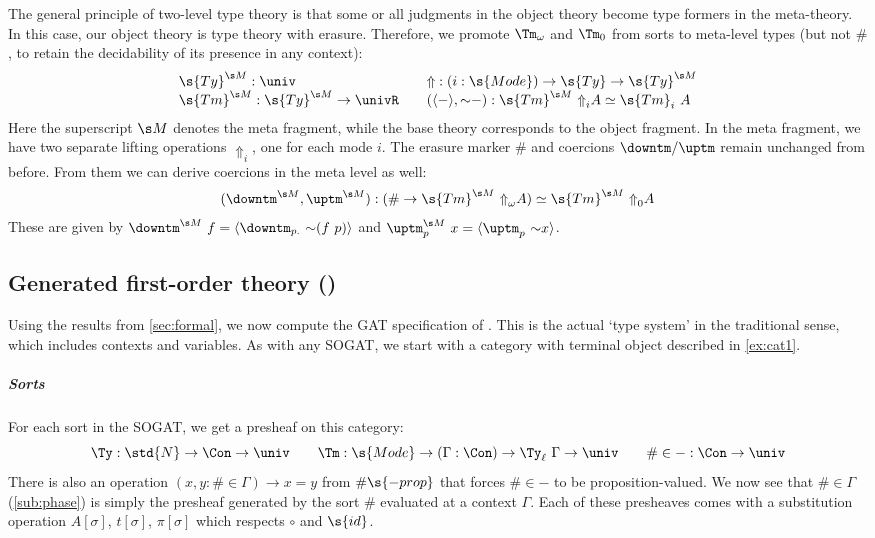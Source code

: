 \documentclass[a4paper,UKenglish,cleveref,autoref,thm-restate]{lipics-v2021}
\begin{document}
The general principle of two-level type theory is that some or all judgments in
the object theory become type formers in the meta-theory. In this case, our
object theory is type theory with erasure. Therefore, we promote $\Tm_\omega$
and $\Tm_0$ from sorts to meta-level types (but not $\#$, to retain the
decidability of its presence in any context):
\[\begin{array}{l@{\qquad}l}
\s{Ty}^{\s M} : \univ & {\Uparrow} : (i : \s{Mode}) \to \s{Ty} \to \s{Ty}^{\s M} \\
\s{Tm}^{\s M} : \s{Ty}^{\s M} \to \univR & (\langle-\rangle, {\sim}-) :
\s{Tm}^{\s M}\ {\Uparrow}_i A \simeq \s{Tm}_i\ A \end{array}\]
Here the
superscript $\s M$ denotes the meta fragment, while the base theory corresponds
to the object fragment. In the meta fragment, we have two separate lifting
operations $\Uparrow_i$, one for each mode $i$. The erasure marker $\#$ and
coercions $\downtm/\uptm$ remain unchanged from before. From them we can derive
coercions in the meta level as well:
\[\begin{array}{l}
  ({\downtm}^{\s M}, {\uptm}^{\s M}) : (\# \to \s{Tm}^{\s M}\
  {\Uparrow}_\omega A) \simeq \s{Tm}^{\s M}\ {\Uparrow}_0 A
\end{array}\]
These are given by $\downtm^{\s M}\ f = \langle {\downtm}_{p.}\ {\sim}(f\ p)
\rangle$ and $\uptm^{\s M}_p\ x = \langle \uptm_p\ {\sim} x \rangle$.


\subsection{Generated first-order theory ()}\label{sub:first-order}

Using the results from \cref{sec:formal}, we now compute the GAT specification
of \ZTT. This is the actual `type system' in the traditional sense, which
includes contexts and variables. As with any SOGAT, we start with a category
with terminal object described in \cref{ex:cat1}.

\subparagraph{Sorts}

For each sort in the SOGAT, we get a presheaf on this category:
\[
\Ty : \std{N} \to \Con \to \univ \qquad \Tm : \s{Mode} \to (\Gamma : \Con) \to
\Ty_\ell\ \Gamma \to \univ \qquad {\#\in-} : \Con \to \univ
\]
There is also an operation $(x, y : \# \in \Gamma) \to x = y$ from $\#\s{-prop}$
that forces $\# \in -$ to be proposition-valued. We now see that $\#\in\Gamma$
(\cref{sub:phase}) is simply the presheaf generated by the sort $\#$ evaluated
at a context $\Gamma$. Each of these presheaves comes with a substitution
operation $A[\sigma]$, $t[\sigma]$, $\pi[\sigma]$ which respects $\circ$ and
$\s{id}$.
\end{document}
